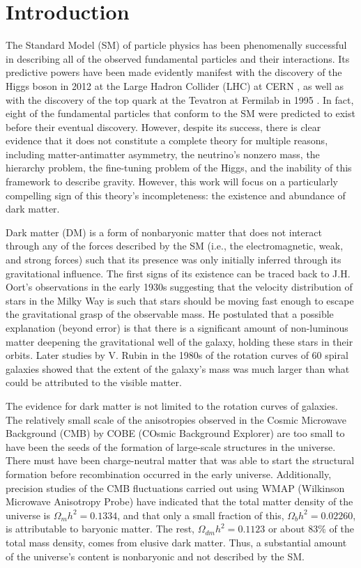 \chapter{Introduction}

The Standard Model (SM) of particle physics has been phenomenally successful in describing all of the observed fundamental particles and their interactions. Its predictive powers have been made evidently manifest with the discovery of the Higgs boson in 2012 at the Large Hadron Collider (LHC) at CERN \cite{collaborationObservationNewBoson2012}, as well as with the discovery of the top quark at the Tevatron at Fermilab in 1995 \cite{abachiObservationTopQuark1995}. In fact, eight of the fundamental particles that conform to the SM were predicted to exist before their eventual discovery. However, despite its success, there is clear evidence that it does not constitute a complete theory \cite{saikumarExploringFrontiersChallenges2024,garrettDarkMatterPrimer2011} for multiple reasons, including matter-antimatter asymmetry, the neutrino's nonzero mass, the hierarchy problem, the fine-tuning problem of the Higgs, and the inability of this framework to describe gravity. However, this work will focus on a particularly compelling sign of this theory's incompleteness: the existence and abundance of dark matter.

Dark matter (DM) is a form of nonbaryonic matter that does not interact through any of the forces described by the SM (i.e., the electromagnetic, weak, and strong forces) such that its presence was only initially inferred through its gravitational influence. The first signs of its existence can be traced back to J.H. Oort's observations in the early 1930s suggesting that the velocity distribution of stars in the Milky Way is such that stars should be moving fast enough to escape the gravitational grasp of the observable mass. He postulated that a possible explanation (beyond error) is that there is a significant amount of non-luminous matter deepening the gravitational well of the galaxy, holding these stars in their orbits. Later studies by V. Rubin in the 1980s of the rotation curves of 60 spiral galaxies showed that the extent of the galaxy's mass was much larger than what could be attributed to the visible matter.

The evidence for dark matter is not limited to the rotation curves of galaxies. The relatively small scale of the anisotropies observed in the Cosmic Microwave Background (CMB) by COBE (COsmic Background Explorer) are too small to have been the seeds of the formation of large-scale structures in the universe. There must have been charge-neutral matter that was able to start the structural formation before recombination occurred in the early universe. Additionally, precision studies of the CMB fluctuations carried out using WMAP (Wilkinson Microwave Anisotropy Probe) have indicated that the total matter density of the universe is $\Omega_{m}h^2 = 0.1334$, and that only a small fraction of this, $\Omega_{b}h^2 = 0.02260$, is attributable to baryonic matter. The rest, $\Omega_{dm}h^2 = 0.1123$ or about $83\%$ of the total mass density, comes from elusive dark matter. Thus, a substantial amount of the universe's content is nonbaryonic and not described by the SM.

